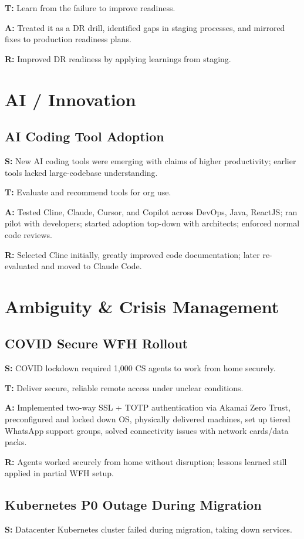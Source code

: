 \documentclass[11pt]{article}
\begin{document}
\textbf{T:} Learn from the failure to improve readiness.

\textbf{A:} Treated it as a DR drill, identified gaps in staging processes, and mirrored fixes to production readiness plans.

\textbf{R:} Improved DR readiness by applying learnings from staging.

\section{AI / Innovation}

\subsection{AI Coding Tool Adoption}
\textbf{S:} New AI coding tools were emerging with claims of higher productivity; earlier tools lacked large-codebase understanding.

\textbf{T:} Evaluate and recommend tools for org use.

\textbf{A:} Tested Cline, Claude, Cursor, and Copilot across DevOps, Java, ReactJS; ran pilot with developers; started adoption top-down with architects; enforced normal code reviews.

\textbf{R:} Selected Cline initially, greatly improved code documentation; later re-evaluated and moved to Claude Code.

\section{Ambiguity \& Crisis Management}

\subsection{COVID Secure WFH Rollout}
\textbf{S:} COVID lockdown required 1,000 CS agents to work from home securely.

\textbf{T:} Deliver secure, reliable remote access under unclear conditions.

\textbf{A:} Implemented two-way SSL + TOTP authentication via Akamai Zero Trust, preconfigured and locked down OS, physically delivered machines, set up tiered WhatsApp support groups, solved connectivity issues with network cards/data packs.

\textbf{R:} Agents worked securely from home without disruption; lessons learned still applied in partial WFH setup.

\subsection{Kubernetes P0 Outage During Migration}
\textbf{S:} Datacenter Kubernetes cluster failed during migration, taking down services.
\end{document}
